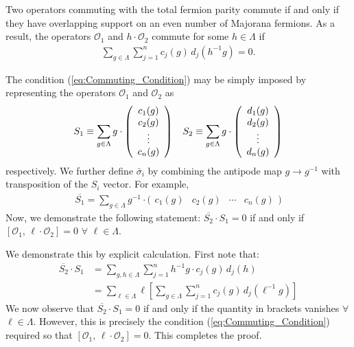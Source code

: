 \documentclass[aps,twocolumn,preprintnumbers,floatfix,showpacs,prx]{revtex4-1}
\begin{document}
Two operators commuting with the total fermion parity commute if and only if they have overlapping support on an even number of Majorana fermions.  As a result, the operators $\mathcal{O}_{1}$ and $h\cdot\mathcal{O}_{2}$ commute for some $h\in\Lambda$ if
\begin{align}\label{eq:Commuting_Condition}
\sum_{g\in\Lambda}\sum_{j = 1}^{n}c_{j}(g)\, d_{j}(h^{-1}g) = 0.
\end{align}

The condition (\ref{eq:Commuting_Condition}) may be simply imposed by representing the operators $\mathcal{O}_{1}$ and $\mathcal{O}_{2}$ as
\begin{align}
S_{1} \equiv \sum_{g\in\Lambda}g\cdot\left(\begin{array}{c}
c_{1}(g)\\
c_{2}(g)\\
\vdots\\
c_{n}(g)
\end{array}
\right) \hspace{.125in}
S_{2} \equiv \sum_{g\in\Lambda}g\cdot \left(\begin{array}{c}
d_{1}(g)\\
d_{2}(g)\\
\vdots\\
d_{n}(g)
\end{array}
\right)
\end{align}
respectively.  We further define $\bar{\sigma}_{i}$ by combining the antipode map $g \rightarrow g^{-1}$ with transposition of the $S_{i}$ vector.  For example, 
\begin{align}
\overline{{S}_{1}} = \sum_{g\in\Lambda}g^{-1}\cdot\Big( \begin{array}{cccc}
c_{1}(g) & c_{2}(g) & \cdots & c_{n}(g)
\end{array}\Big)
\end{align}
Now, we demonstrate the following statement: $\overline{{S}_{2}}\cdot S_{1} = 0$ if and only if $[\mathcal{O}_{1},\, \ell\cdot\mathcal{O}_{2}] = 0$ $\forall$ $\ell\in\Lambda$.

We demonstrate this by explicit calculation.  First note that:
\begin{align}
\overline{S_{2}}\cdot S_{1} &= \sum_{g, h\in\Lambda}\sum_{j = 1}^{n}h^{-1}g \cdot c_{j}(g)\,d_{j}(h)\\
&= \sum_{\ell\in\Lambda}\ell \left[\sum_{g\in\Lambda}\sum_{j = 1}^{n}c_{j}(g)\,d_{j}(\ell^{-1}g)\right]
\end{align}
We now observe that $\overline{S_{2}}\cdot S_{1} = 0$ if and only if the quantity in brackets vanishes $\forall$ $\ell\in\Lambda$.  However, this is precisely the condition (\ref{eq:Commuting_Condition}) required so that $[\mathcal{O}_{1}, \,\ell\cdot\mathcal{O}_{2}] = 0$.  This completes the proof.
\end{document}
